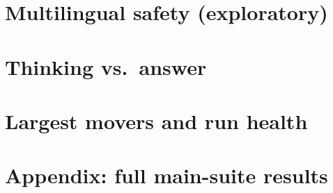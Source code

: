 \documentclass[10pt]{article}
\begin{document}
\clearpage
\section*{Multilingual safety (exploratory)}


\clearpage
\section*{Thinking vs.\ answer}


\clearpage
\section*{Largest movers and run health}





\clearpage
\section*{Appendix: full main-suite results}

\end{document}
